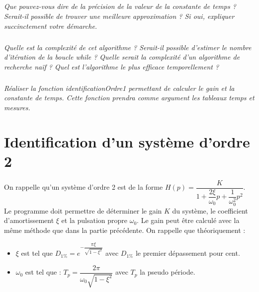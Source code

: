 \documentclass[10pt]{article}
\newif\ifprof
\begin{document}
\subparagraph{}
\textit{Que pouvez-vous dire de la précision de la valeur de la constante de temps ? Serait-il possible de trouver une meilleure approximation ?
Si oui, expliquer succinctement votre démarche.}
\ifprof
\begin{corrige}
Dans ce cas, on prend la mesure la plus proche des 63\% de la valeur finale. On pourrait interpoler la mesure pour avoir une meilleure approximation du temps de réponse.
\end{corrige}
\else
\fi


\subparagraph{}
\textit{Quelle est la complexité de cet algorithme ? Serait-il possible d'estimer le nombre d'itération de la boucle \textsl{while} ? Quelle serait la complexité d'un algorithme de recherche naïf ? Quel est l'algorithme le plus efficace temporellement ?}
\ifprof
\begin{corrige}
L'algormithme de dichotomie a une complexité $\mathcal{O}(log(n))$.

 Dans le pire des cas, pour un tableau de $n$ éléments, on cherche le nombre d'itération $k$ tel que $\dfrac{n}{2^k}<1$ soit $k>\dfrac{\log n}{\log 2}$. 
 
L'algorithme naïf aurait ici une complexité linéaire ce qui est moins efficace qu'un algorithme logarithmique. 

\end{corrige}
\else
\fi


\subparagraph{}
\textit{Réaliser la fonction \textsf{identificationOrdre1} permettant de calculer le gain et la constante de temps. Cette fonction prendra comme argument les tableaux \textsf{temps} et \textsf{mesures}.}
\ifprof
\begin{corrige}
\begin{py}
\begin{python}
def identificationOrdre1(temps,mesures,E0):
    K = calculGainMoyen(mesures,E0)
    tau = calculTau(temps,mesures,E0)
    return K,tau
\end{python}
\end{py}
\end{corrige}
\else
\fi
\section{Identification d'un système d'ordre 2}
\ifprof
\else
On rappelle qu'un système d'ordre 2 est de la forme $H(p)=\dfrac{K}{1 + \dfrac{2\xi}{\omega_0} p +\dfrac{1}{\omega_0^2}p^2}$. Le programme doit permettre de déterminer le gain $K$ du système, le coefficient d'amortissement $\xi$ et la pulsation propre $\omega_0$.
Le gain peut être calculé avec la même méthode que dans la partie précédente. On rappelle que théoriquement : 
\begin{itemize}
\item $\xi$ est tel que $D_{1\%}=e^{-\dfrac{\pi \xi }{\sqrt{1-\xi^2}}}$ avec $D_{1\%}$ le premier dépassement pour cent. 
\item $\omega_0$ est tel que : $T_p = \dfrac{2\pi}{\omega_0\sqrt{1-\xi^2}}$ avec $T_p$ la pseudo période.
\end{itemize}
\end{document}
